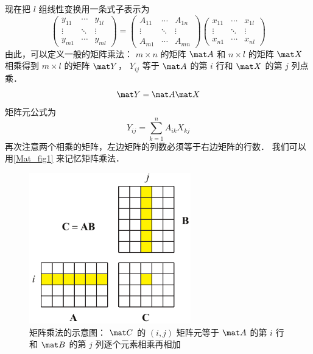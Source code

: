 现在把 $l$ 组线性变换用一条式子表示为
\begin{equation}
\begin{pmatrix}
y_{11} & \cdots & y_{1l} \\
 \vdots & \ddots & \vdots \\
y_{m1} & \cdots & y_{ml}
\end{pmatrix}
=
\begin{pmatrix}
A_{11} & \cdots & A_{1n} \\
 \vdots & \ddots & \vdots \\
A_{m1} & \cdots & A_{mn}
\end{pmatrix}
\begin{pmatrix}
x_{11} & \cdots & x_{1l} \\
 \vdots & \ddots & \vdots \\
x_{n1} & \cdots & x_{nl}
\end{pmatrix}
\end{equation}
由此，可以定义一般的矩阵乘法： $m \times n$ 的矩阵 $\mat A$ 和 $n \times l$ 的矩阵 $\mat X$ 相乘得到 $m \times l$ 的矩阵 $\mat Y$，  $Y_{ij}$ 等于 $\mat A$ 的第 $i$ 行和 $\mat X$ 的第 $j$ 列点乘．
\begin{equation}
\mat Y=\mat A\mat X
\end{equation}
矩阵元公式为
\begin{equation}
Y_{ij} = \sum_{k = 1}^n A_{ik} X_{kj}
\end{equation}
再次注意两个相乘的矩阵，左边矩阵的列数必须等于右边矩阵的行数． 我们可以用\autoref{Mat_fig1} 来记忆矩阵乘法．

\begin{figure}[ht]
\centering
\includegraphics[width=7cm]{./figures/Mat1.pdf}
\caption{矩阵乘法的示意图： $\mat C$ 的 $(i, j)$ 矩阵元等于 $\mat A$ 的第 $i$ 行和 $\mat B$ 的第 $j$ 列逐个元素相乘再相加} \label{Mat_fig1}
\end{figure}

